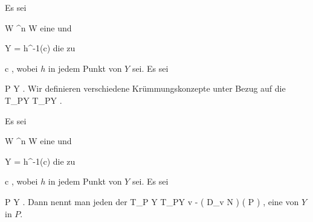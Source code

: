 \setcounter{section}{5}


Es sei

\mavergleichskette
{\vergleichskette
{ W
}
{ \subseteq }{ \R^n
}
{  }{
}
{    }{
}
{   }{
}
}
{}{}{}
 { W } { \R
} {}
eine
und

\mavergleichskette
{\vergleichskette
{ Y
}
{ = }{ h^{-1}(c)
}
{  }{
}
{    }{
}
{   }{
}
}
{}{}{}
die
zu

\mavergleichskette
{\vergleichskette
{ c
}
{ \in }{ \R
}
{  }{
}
{    }{
}
{   }{
}
}
{}{}{,}
wobei $h$ in jedem Punkt von $Y$
sei. Es sei

\mavergleichskette
{\vergleichskette
{ P
}
{ \in }{ Y
}
{  }{
}
{    }{
}
{   }{
}
}
{}{}{.}
Wir definieren verschiedene Krümmungskonzepte unter Bezug auf die
 {T_PY} { T_PY
} {.}

{}
{

Es sei

\mavergleichskette
{\vergleichskette
{ W
}
{ \subseteq }{ \R^n
}
{  }{
}
{    }{
}
{   }{
}
}
{}{}{}
 { W } { \R
} {}
eine
und

\mavergleichskette
{\vergleichskette
{ Y
}
{ = }{ h^{-1}(c)
}
{  }{
}
{    }{
}
{   }{
}
}
{}{}{}
die
zu

\mavergleichskette
{\vergleichskette
{ c
}
{ \in }{ \R
}
{  }{
}
{    }{
}
{   }{
}
}
{}{}{,}
wobei $h$ in jedem Punkt von $Y$
sei. Es sei

\mavergleichskette
{\vergleichskette
{ P
}
{ \in }{ Y
}
{  }{
}
{    }{
}
{   }{
}
}
{}{}{.}
Dann nennt man jeden
der
 {T_P Y} { T_PY
} { v } { - \left(  D_{v}  N   \right) \left(   P  \right)
} {,}
eine
von $Y$ in $P$.

}

